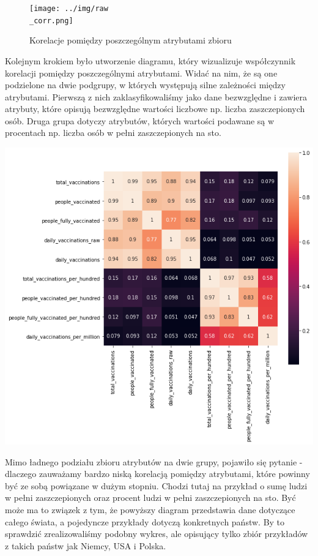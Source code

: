 \documentclass[12pt, oneside, openany]{article}
\begin{document}
\begin{figure}
\centering
\texttt{[image: ../img/raw\\\_corr.png]} \label{Rys:kor}
\caption{Korelacje pomiędzy poszczególnym atrybutami zbioru}
\label{Rys:kor}
\end{figure}

Kolejnym krokiem było utworzenie diagramu, który wizualizuje współczynnik korelacji pomiędzy poszczególnymi atrybutami. Widać na nim, że są one podzielone na dwie podgrupy, w których występują silne zależności między atrybutami. Pierwszą z nich zaklasyfikowaliśmy jako dane bezwzględne i zawiera atrybuty, które opisują bezwzględne wartości liczbowe np. liczba zaszczepionych osób. Druga grupa dotyczy atrybutów, których wartości podawane są w procentach np. liczba osób w pełni zaszczepionych na sto. 

\begin{center}
\includegraphics[scale=0.7]
{../img/corelation.png} 
\end{center}

Mimo ładnego podziału zbioru atrybutów na dwie grupy, pojawiło się pytanie - dlaczego zauważamy bardzo niską korelacją pomiędzy atrybutami, które powinny być ze sobą powiązane w dużym stopniu. Chodzi tutaj na przykład o sumę ludzi w pełni zaszczepionych oraz procent ludzi w pełni zaszczepionych na sto. Być może ma to związek z tym, że powyższy diagram przedstawia dane dotyczące całego świata, a pojedyncze przykłady dotyczą konkretnych państw. By to sprawdzić zrealizowaliśmy podobny wykres, ale opisujący  tylko zbiór przykładów z takich państw jak Niemcy, USA i Polska.
\end{document}
